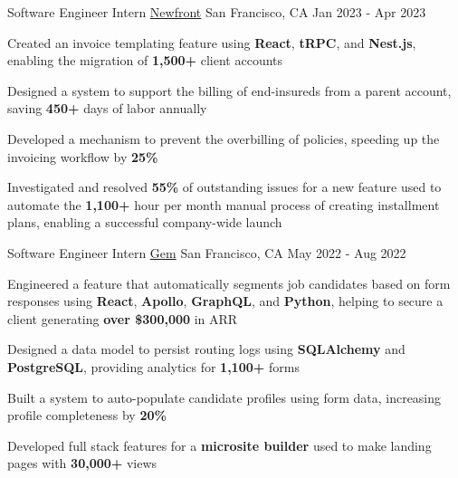 
\begin{cventries}
  \cventry
    {Software Engineer Intern} %
    {\href{https://www.newfront.com/}{Newfront}} %
    {San Francisco, CA} %
    {Jan 2023 - Apr 2023} %
    {
      \begin{cvitems} %
      \item {Created an invoice templating feature using \textbf{React}, \textbf{tRPC}, and \textbf{Nest.js}, enabling the migration of \textbf{1,500+} client accounts}
      \item {Designed a system to support the billing of end-insureds from a parent account, saving \textbf{450+} days of labor annually}
      \item {Developed a mechanism to prevent the overbilling of policies, speeding up the invoicing workflow by \textbf{25\%}}
      \item {Investigated and resolved \textbf{55\%} of outstanding issues for a new feature used to automate the \textbf{1,100+} hour per month manual process of creating installment plans, enabling a successful company-wide launch}
      \end{cvitems}
    }

  \cventry
    {Software Engineer Intern} %
    {\href{https://www.gem.com/}{Gem}} %
    {San Francisco, CA} %
    {May 2022 - Aug 2022} %
    {
      \begin{cvitems} %
      \item {Engineered a feature that automatically segments job candidates based on form responses using \textbf{React}, \textbf{Apollo}, \textbf{GraphQL}, and \textbf{Python}, helping to secure a client generating \textbf{over \$300,000} in ARR}
      \item {Designed a data model to persist routing logs using \textbf{SQLAlchemy} and \textbf{PostgreSQL}}, providing analytics for \textbf{1,100+} forms
      \item {Built a system to auto-populate candidate profiles using form data, increasing profile completeness by \textbf{20\%}}
      \item {Developed full stack features for a \textbf{microsite builder} used to make landing pages with \textbf{30,000+} views}
      \end{cvitems}
    }


\end{cventries}

